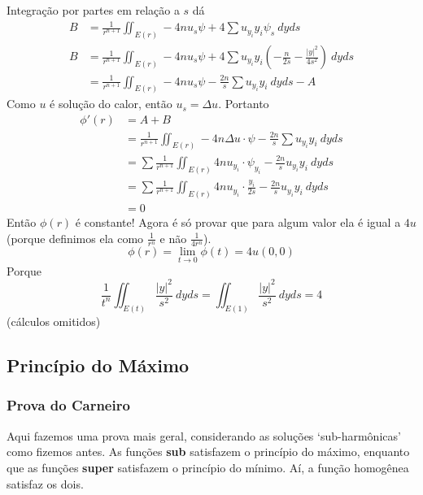 \documentclass[11pt]{article}
\begin{document}
Integração por partes em relação a \(s\) dá\begin{align*}
	B&=\frac{1}{r^{n+1}} \iint_{E(r)} -4nu_s\psi + 4\sum u_{y_i} y_i \psi_s\ dyds\\
	B&=\frac{1}{r^{n+1}} \iint_{E(r)} -4nu_s\psi + 4\sum u_{y_i} y_i \left(-\frac{n}{2s}-\frac{|y|^2}{4s^2}\right)\ dyds\\
	&=\frac{1}{r^{n+1}} \iint_{E(r)} -4nu_s\psi -\frac{2n}{s}\sum u_{y_i}y_i\ dy ds - A 
\end{align*}
Como \(u\) é solução do calor, então \(u_s = \Delta u\). Portanto \begin{align*}
	\phi'(r) &= A + B \\
	&=\frac{1}{r^{n+1}} \iint_{E(r)} -4n\Delta u\cdot \psi - \frac{2n}{s}\sum u_{y_i}y_i\ dyds\\
	&=\sum \frac{1}{r^{n+1}} \iint_{E(r)} 4n u_{y_i}\cdot \psi_{y_i} - \frac{2n}{s} u_{y_i}y_i\ dyds\\
	&=\sum \frac{1}{r^{n+1}} \iint_{E(r)} 4n u_{y_i}\cdot \frac{y_i}{2s} - \frac{2n}{s} u_{y_i}y_i\ dyds \\
	&=0
\end{align*}
Então \(\phi(r)\) é constante! Agora é só provar que para algum valor ela é igual a \(4u\) (porque definimos ela como \( \frac{1}{r^{n}} \) e não \( \frac{1}{4r^n} \)).
\[\phi(r) = \lim_{t\rightarrow 0}\phi(t) = 4u(0,0)\]
Porque \[\frac{1}{t^n}\iint_{E(t)}\frac{|y|^2}{s^2}\ dyds = \iint_{E(1)} \frac{|y|^2}{s^2}\ dy ds = 4\] (cálculos omitidos)


\subsection{Princípio do Máximo}
\subsubsection*{Prova do Carneiro}

Aqui fazemos uma prova mais geral, considerando as soluções `sub-harmônicas' como fizemos antes. As funções \textbf{sub} satisfazem o princípio do máximo, enquanto que as funções \textbf{super} satisfazem o princípio do mínimo. Aí, a função homogênea satisfaz os dois.
\end{document}
